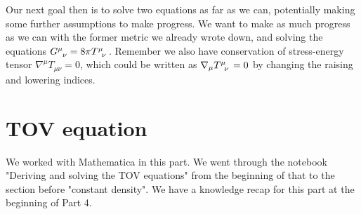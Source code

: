 \documentclass[10pt]{article}
\begin{document}
Our next goal then is to solve two equations as far as we can, potentially making some further assumptions to make progress. We want to make as much progress as we can with the former metric we already wrote down, and solving the equations $\tensor{G}{^\mu_\nu}=8\pi\tensor{T}{^\mu_\nu}$. Remember we also have conservation of stress-energy tensor $\nabla^\mu T_{\mu\nu}=0$, which could be written as $\nabla{_\mu} \tensor{T}{^\mu_\nu}=0$ by changing the raising and lowering indices.
\newpage
\part{TOV equation}
We worked with Mathematica in this part. We went through the notebook "Deriving and solving the TOV equations" from the beginning of that to the section before "constant density". We have a knowledge recap for this part at the beginning of Part 4.
\newpage
\end{document}
